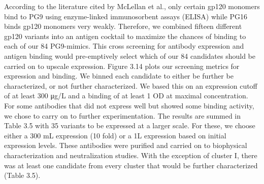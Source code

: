 According to the literature cited by McLellan et al., only certain gp120 monomers bind to PG9 using enzyme-linked immunosorbent assays (ELISA) while PG16 binds gp120 monomers very weakly. Therefore, we combined fifteen different gp120 variants into an antigen cocktail to maximize the chances of binding to each of our 84 PG9-mimics. This cross screening for antibody expression and antigen binding would pre-emptively select which of our 84 candidates should be carried on to upscale expression.
Figure 3.14 plots our screening metrics for expression and binding. We binned each candidate to either be further be characterized, or not further characterized. We based this on an expression cutoff of at least 300 μg/L and a binding of at least 1 OD at maximal concentration.  For some antibodies that did not express well but showed some binding activity, we chose to carry on to further experimentation. The results are summed in Table 3.5 with 35 variants to be expressed at a larger scale. For these, we choose either a 300 mL expression (10 fold) or a 1L expression based on initial expression levels. These antibodies were purified and carried on to biophysical characterization and neutralization studies. With the exception of cluster I, there was at least one candidate from every cluster that would be further characterized (Table 3.5).

